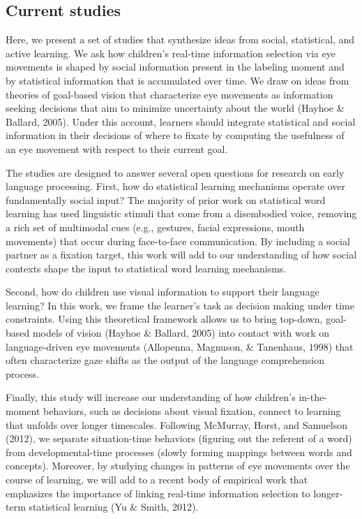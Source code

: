 \documentclass[man,floatsintext]{apa6}
\begin{document}
\subsection{Current studies}\label{current-studies}

Here, we present a set of studies that synthesize ideas from social,
statistical, and active learning. We ask how children's real-time
information selection via eye movements is shaped by social information
present in the labeling moment and by statistical information that is
accumulated over time. We draw on ideas from theories of goal-based
vision that characterize eye movements as information seeking decisions
that aim to minimize uncertainty about the world (Hayhoe \& Ballard,
2005). Under this account, learners should integrate statistical and
social information in their decisions of where to fixate by computing
the usefulness of an eye movement with respect to their current goal.

The studies are designed to answer several open questions for research
on early language processing. First, how do statistical learning
mechanisms operate over fundamentally social input? The majority of
prior work on statistical word learning has used linguistic stimuli that
come from a disembodied voice, removing a rich set of multimodal cues
(e.g., gestures, facial expressions, mouth movements) that occur during
face-to-face communication. By including a social partner as a fixation
target, this work will add to our understanding of how social contexts
shape the input to statistical word learning mechanisms.

Second, how do children use visual information to support their language
learning? In this work, we frame the learner's task as decision making
under time constraints. Using this theoretical framework allows us to
bring top-down, goal-based models of vision (Hayhoe \& Ballard, 2005)
into contact with work on language-driven eye movements (Allopenna,
Magnuson, \& Tanenhaus, 1998) that often characterize gaze shifts as the
output of the language comprehension process.

Finally, this study will increase our understanding of how children's
in-the-moment behaviors, such as decisions about visual fixation,
connect to learning that unfolds over longer timescales. Following
McMurray, Horst, and Samuelson (2012), we separate situation-time
behaviors (figuring out the referent of a word) from developmental-time
processes (slowly forming mappings between words and concepts).
Moreover, by studying changes in patterns of eye movements over the
course of learning, we will add to a recent body of empirical work that
emphasizes the importance of linking real-time information selection to
longer-term statistical learning (Yu \& Smith, 2012).
\end{document}
